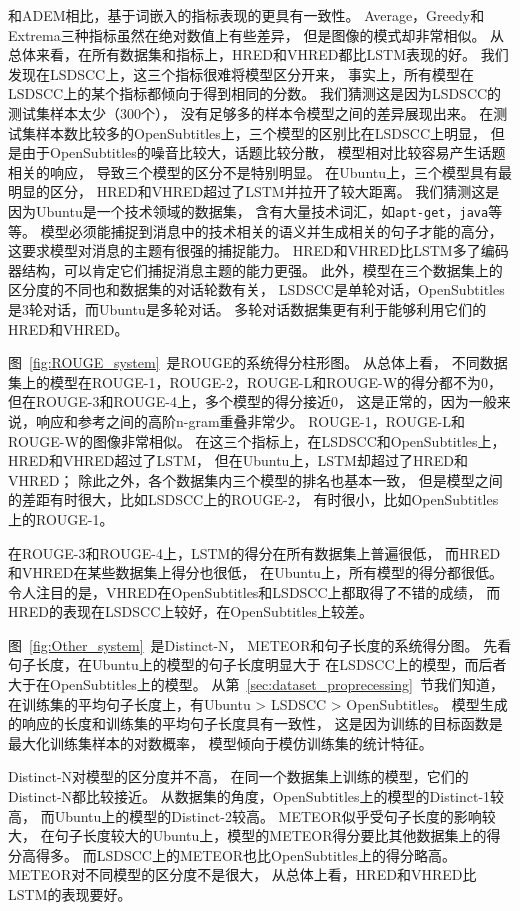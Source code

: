 和ADEM相比，基于词嵌入的指标表现的更具有一致性。
Average，Greedy和Extrema三种指标虽然在绝对数值上有些差异，
但是图像的模式却非常相似。
从总体来看，在所有数据集和指标上，HRED和VHRED都比LSTM表现的好。
我们发现在LSDSCC上，这三个指标很难将模型区分开来，
事实上，所有模型在LSDSCC上的某个指标都倾向于得到相同的分数。
我们猜测这是因为LSDSCC的测试集样本太少（300个），
没有足够多的样本令模型之间的差异展现出来。
在测试集样本数比较多的OpenSubtitles上，三个模型的区别比在LSDSCC上明显，
但是由于OpenSubtitles的噪音比较大，话题比较分散，
模型相对比较容易产生话题相关的响应，
导致三个模型的区分不是特别明显。
在Ubuntu上，三个模型具有最明显的区分，
HRED和VHRED超过了LSTM并拉开了较大距离。
我们猜测这是因为Ubuntu是一个技术领域的数据集，
含有大量技术词汇，如\texttt{apt-get}，\texttt{java}等等。
模型必须能捕捉到消息中的技术相关的语义并生成相关的句子才能的高分，
这要求模型对消息的主题有很强的捕捉能力。
HRED和VHRED比LSTM多了编码器结构，可以肯定它们捕捉消息主题的能力更强。
此外，模型在三个数据集上的区分度的不同也和数据集的对话轮数有关，
LSDSCC是单轮对话，OpenSubtitles是3轮对话，而Ubuntu是多轮对话。
多轮对话数据集更有利于能够利用它们的HRED和VHRED。


图~\ref{fig:ROUGE_system}~是ROUGE的系统得分柱形图。
从总体上看，
不同数据集上的模型在ROUGE-1，ROUGE-2，ROUGE-L和ROUGE-W的得分都不为0，
但在ROUGE-3和ROUGE-4上，多个模型的得分接近0，
这是正常的，因为一般来说，响应和参考之间的高阶n-gram重叠非常少。
ROUGE-1，ROUGE-L和ROUGE-W的图像非常相似。
在这三个指标上，在LSDSCC和OpenSubtitles上，HRED和VHRED超过了LSTM，
但在Ubuntu上，LSTM却超过了HRED和VHRED；
除此之外，各个数据集内三个模型的排名也基本一致，
但是模型之间的差距有时很大，比如LSDSCC上的ROUGE-2，
有时很小，比如OpenSubtitles上的ROUGE-1。

在ROUGE-3和ROUGE-4上，LSTM的得分在所有数据集上普遍很低，
而HRED和VHRED在某些数据集上得分也很低，
在Ubuntu上，所有模型的得分都很低。
令人注目的是，VHRED在OpenSubtitles和LSDSCC上都取得了不错的成绩，
而HRED的表现在LSDSCC上较好，在OpenSubtitles上较差。


图~\ref{fig:Other_system}~是Distinct-N，
METEOR和句子长度的系统得分图。
先看句子长度，在Ubuntu上的模型的句子长度明显大于
在LSDSCC上的模型，而后者大于在OpenSubtitles上的模型。
从第~\ref{sec:dataset_proprecessing}~节我们知道，
在训练集的平均句子长度上，有Ubuntu > LSDSCC > OpenSubtitles。
模型生成的响应的长度和训练集的平均句子长度具有一致性，
这是因为训练的目标函数是最大化训练集样本的对数概率，
模型倾向于模仿训练集的统计特征。

Distinct-N对模型的区分度并不高，
在同一个数据集上训练的模型，它们的Distinct-N都比较接近。
从数据集的角度，OpenSubtitles上的模型的Distinct-1较高，
而Ubuntu上的模型的Distinct-2较高。
METEOR似乎受句子长度的影响较大，
在句子长度较大的Ubuntu上，模型的METEOR得分要比其他数据集上的得分高得多。
而LSDSCC上的METEOR也比OpenSubtitles上的得分略高。
METEOR对不同模型的区分度不是很大，
从总体上看，HRED和VHRED比LSTM的表现要好。

